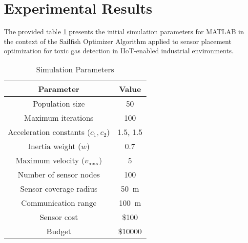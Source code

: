\documentclass[conference]{IEEEtran}
\begin{document}
\section{Experimental Results}\label{sec4}
The provided table \ref{tab:parameters} presents the initial simulation parameters for MATLAB in the context of the Sailfish Optimizer Algorithm applied to sensor placement optimization for toxic gas detection in IIoT-enabled industrial environments. 
\begin{table}[ht!]
  \centering
  \caption{Simulation Parameters}
  \label{tab:parameters}
  \begin{tabular}{|c|c|}
  \hline
    \textbf{Parameter} & \textbf{Value} \\\hline
    Population size & 50 \\ \hline
    Maximum iterations & 100 \\ \hline
    Acceleration constants ($c_1, c_2$) & {1.5, 1.5} \\\hline
    Inertia weight ($w$) & 0.7 \\\hline
    Maximum velocity ($v_{\text{max}}$) & 5 \\\hline
    Number of sensor nodes & 100 \\\hline
    Sensor coverage radius & \SI{50}{\meter} \\\hline
    Communication range & \SI{100}{\meter} \\\hline
    Sensor cost & \$100 \\\hline
    Budget & \$10000 \\\hline
  \end{tabular}
\end{table}
\end{document}
